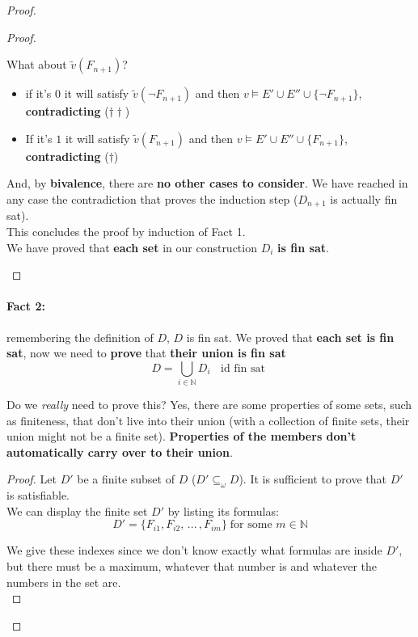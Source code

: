 \begin{proof}
\begin{proof}
\begin{itemize}
				What about $\tilde{v}(F_{n+1})$?
				\begin{itemize}
					\item if it's $0$ it will satisfy $\tilde{v} (\neg F_{n+1})$ and then $v \models E' \cup E'' \cup \{\neg F_{n+1}\}$, \textbf{contradicting} ($\dag \dag$)
					\item If it's $1$ it will satisfy $\tilde{v} (F_{n+1})$ and then $v \models E' \cup E'' \cup \{F_{n+1}\}$, \textbf{contradicting} ($\dag$)
				\end{itemize}
				And, by \textbf{bivalence}, there are \textbf{no other cases to consider}. We have reached in any case the contradiction that proves the induction step ($D_{n+1}$ is actually fin sat).\\
				This concludes the proof by induction of Fact 1.\\

				We have proved that \textbf{each set} in our construction $D_i$ \textbf{is fin sat}.\\
			\end{itemize}
		\end{proof}

		\newpage

		\paragraph{Fact 2:} remembering the definition of $D$, $D$ is fin sat. We proved that \textbf{each set is fin sat}, now we need to \textbf{prove} that \textbf{their union is fin sat}
		$$ D = \bigcup_{i \in \mathbb{N}} D_i \;\; \text{ id fin sat } $$

		Do we \textit{really} need to prove this? Yes, there are some properties of some sets, such as finiteness, that don't live into their union (with a collection of finite sets, their union might not be a finite set). \textbf{Properties of the members don't automatically carry over to their union}.\\

		\begin{proof}
			Let $D'$ be a finite subset of $D$ ($D' \subseteq_\omega D$). It is sufficient to prove that $D'$ is satisfiable.\\

			We can display the finite set $D'$ by listing its formulas:
			$$ D' = \{F_{i1}, F_{i2}, \, ... \, , F_{im}\} \; \text{for some } m \in \mathbb{N} $$

			We give these indexes since we don't know exactly what formulas are inside $D'$, but there must be a maximum, whatever that number is and whatever the numbers in the set are.\\


\end{proof}
\end{proof}
